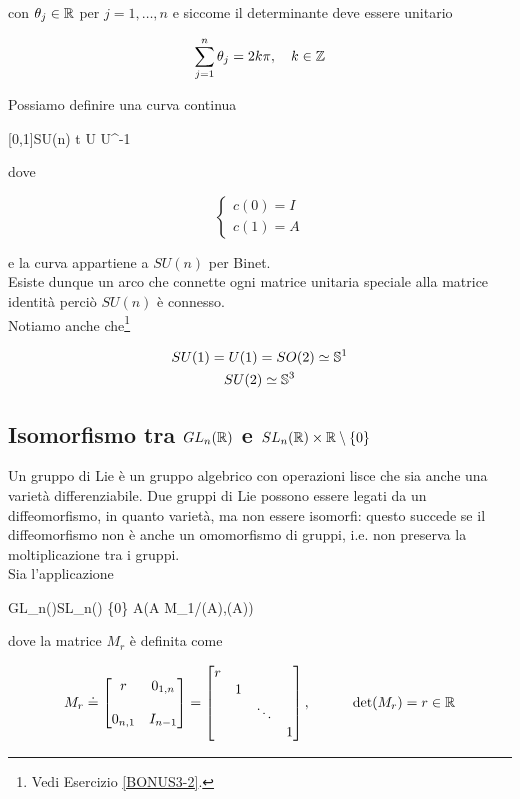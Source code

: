 con $ \theta_{j} \in \R $ per $ j=1,\dots,n $ e siccome il determinante deve essere unitario

\begin{equation}
	\sum_{j=1}^{n} \theta_{j} = 2 k \pi \qcomma k \in \Z
\end{equation}

Possiamo definire una curva continua

	{[0,1]}{SU(n)}
	{t}{ %
			U  U^{-1} %
			}

dove

\begin{equation}
	\begin{cases}
		c(0) = I \\
		c(1) = A
	\end{cases}
\end{equation}

e la curva appartiene a $ SU(n) $ per Binet.\\
Esiste dunque un arco che connette ogni matrice unitaria speciale alla matrice identità perciò $ SU(n) $ è connesso.\\
Notiamo anche che\footnote{%
	Vedi Esercizio \ref{BONUS3-2}.%
}

\begin{gather}
	SU(1) = U(1) = SO(2) \simeq \S^{1} \\
	SU(2) \simeq \S^{3}
\end{gather}

\subsection{Isomorfismo tra $ GL_{n}(\R) $ e $ SL_{n}(\R) \times \R \setminus \{0\} $}

Un gruppo di Lie è un gruppo algebrico con operazioni lisce che sia anche una varietà differenziabile. Due gruppi di Lie possono essere legati da un diffeomorfismo, in quanto varietà, ma non essere isomorfi: questo succede se il diffeomorfismo non è anche un omomorfismo di gruppi, i.e. non preserva la moltiplicazione tra i gruppi.\\
Sia l'applicazione

	{GL_{n}(\R)}{SL_{n}(\R) \times \R \setminus \{0\}}
	{A}{(A M_{1/\det(A)},\det(A))}

dove la matrice $ M_{r} $ è definita come

\begin{equation}
	M_{r} \doteq %
	\bmqty{ %
			r & 0_{1,n} \\\\
			0_{n,1} & I_{n-1} %
			} = %
	\bmqty{ %
			\dmat{ %
					r, %
					1, %
					\ddots, %
					1 %
					} %
			} %
	\qcomma \qquad \det(M_{r}) = r \in \R
\end{equation}

